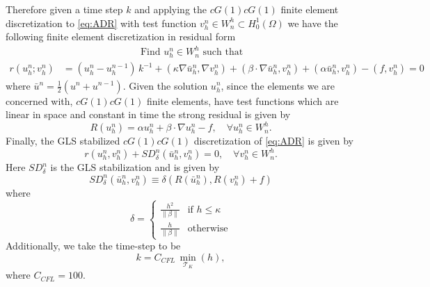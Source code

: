     Therefore given a time step $k$ and applying the $cG(1)cG(1)$ finite element
    discretization to \eqref{eq:ADR} with test function $v^n_h \in W^h_n \subset
    H^1_0(\Omega)$ we have the following finite element discretization
    in residual form
    \begin{equation}
    \begin{split}
        &\hspace{8em}\text{Find } u^n_h \in W^h_n \text{ such that} \\
        r(u^n_h; v^n_h) &= \left(u^n_h - u^{n-1}_h\right)\,k^{-1}
            + (\kappa \nabla \bar{u}^n_h, \nabla v^n_h)
            + (\beta \cdot \nabla \bar{u}^n_h, v^n_h)
            + (\alpha \bar{u}^n_h, v^n_h) - (f, v^n_h) = 0
    \end{split}
    \label{eqn:WeakADR}
    \end{equation}
    where $\bar{u}^n = \frac{1}{2}\left(u^n + u^{n-1}\right)$. Given the
    solution $u^n_h$, since the elements we are concerned with, $cG(1)cG(1)$
    finite elements, have test functions which are linear in space and constant
    in time the strong residual is given by
    \begin{equation}
        R(u^n_h) = \alpha u^n_h + \beta \cdot \nabla u^n_h - f, \quad \forall
            u^n_h \in W^h_n.
    \label{eqn:StrongADR}
    \end{equation}
    Finally, the GLS stabilized $cG(1)cG(1)$ discretization of \eqref{eq:ADR} is
    given by
    \begin{equation}
        r(u^n_h, v^n_h) + SD_{\delta}^n(\bar{u}^n_h,v^n_h) = 0,
            \quad \forall v^n_h \in W^h_n.
        \label{eqn:G2ADR}
    \end{equation}
    Here $SD_{\delta}^n$ is the GLS stabilization and is given by
    \begin{equation}
        SD_{\delta}^n(\bar{u}^n_h, v^n_h) \equiv
            \delta \left(R(\bar{u}^n_h), R(v^n_h) + f\right)
    \label{eq:ADRStabilization}
    \end{equation}
    where
    \begin{equation}
        \delta = \begin{cases}
            \frac{h^2}{\|\beta\|} & \text{if } h \le \kappa \\
            \frac{h}{\|\beta\|} & \text{otherwise}
        \end{cases}
        \label{eq:ADRdelta}
    \end{equation}
    Additionally, we take the time-step to be
    \begin{equation*}
        k = C_{CFL}\, \min_{\mathcal{T}_K}(h),
    \end{equation*}
    where $C_{CFL}=100$.


